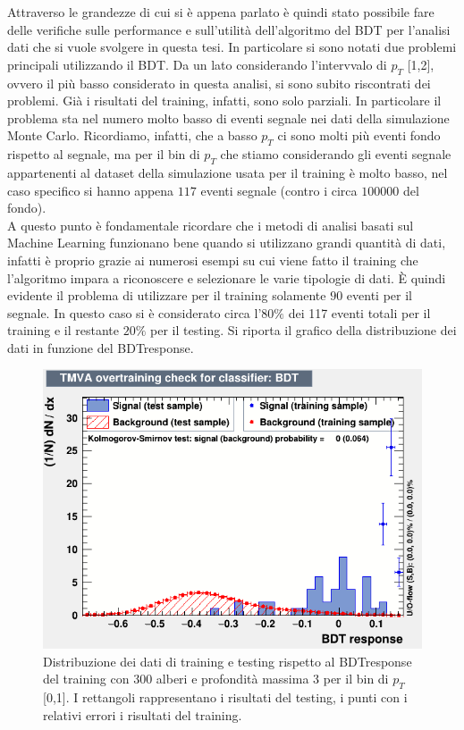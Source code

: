 Attraverso le grandezze di cui si è appena parlato è quindi stato possibile fare delle verifiche sulle performance e sull'utilità dell'algoritmo del BDT per l'analisi dati che si vuole svolgere in questa tesi. In particolare si sono notati due problemi principali utilizzando il BDT. Da un lato considerando l'intervvalo di $p_T$ [1,2], ovvero il più basso considerato in questa analisi, si sono subito riscontrati dei problemi. Già i risultati del training, infatti, sono solo parziali. In particolare il problema sta nel numero molto basso di eventi segnale nei dati della simulazione Monte Carlo. Ricordiamo, infatti, che a basso $p_T$ ci sono molti più eventi fondo rispetto al segnale, ma per il bin di $p_T$ che stiamo considerando gli eventi segnale appartenenti al dataset della simulazione usata per il training è molto basso, nel caso specifico si hanno appena $117$ eventi segnale (contro i circa $100000$ del fondo). 
\\A questo punto è fondamentale ricordare che i metodi di analisi basati sul Machine Learning funzionano bene quando si utilizzano grandi quantità di dati, infatti è proprio grazie ai numerosi esempi su cui viene fatto il training che l'algoritmo impara a riconoscere e selezionare le varie tipologie di dati. 
È quindi evidente il problema di utilizzare per il training solamente $90$ eventi per il segnale. In questo caso si è considerato circa l'$80\%$ dei 117 eventi totali per il training e il restante $20\%$ per il testing. Si riporta il grafico della distribuzione dei dati in funzione del BDTresponse. 

 \begin{figure}[htbp] 
        \centering
        \includegraphics[width=0.7\linewidth]{training&testing/BDTresponse_0_1.png}
        \caption{Distribuzione dei dati di training e testing rispetto al BDTresponse del training con 300 alberi e profondità massima 3 per il bin di $p_T$ [0,1]. I rettangoli rappresentano i risultati del testing, i punti con i relativi errori i risultati del training.
        }
        \label{fig:BDTresponse_0_1}
    \end{figure}
    
